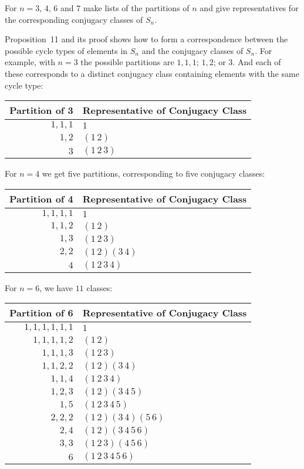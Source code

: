  For $n = 3$, $4$, $6$ and $7$ make lists of the partitions
of $n$ and give representatives for the corresponding conjugacy
classes of $S_n$.
\begin{solution}
  Proposition~11 and its proof shows how to form a correspondence
  between the possible cycle types of elements in $S_n$ and the
  conjugacy classes of $S_n$. For example, with $n = 3$ the possible
  partitions are $1, 1, 1$; $1, 2$; or $3$. And each of these
  corresponds to a distinct conjugacy class containing elements with
  the same cycle type:
  \begin{center}
    \begin{tabular}{r|l}
      \bf Partition of 3 & \bf Representative of Conjugacy Class \\
      \hline
      $1, 1, 1$ & $1$ \\
      $1, 2$ & $(1\,2)$ \\
      $3$ & $(1\,2\,3)$
    \end{tabular}
  \end{center}

  For $n = 4$ we get five partitions, corresponding to five conjugacy
  classes:
  \begin{center}
    \begin{tabular}{r|l}
      \bf Partition of 4 & \bf Representative of Conjugacy Class \\
      \hline
      $1, 1, 1, 1$ & $1$ \\
      $1, 1, 2$ & $(1\,2)$ \\
      $1, 3$ & $(1\,2\,3)$ \\
      $2, 2$ & $(1\,2)(3\,4)$ \\
      $4$ & $(1\,2\,3\,4)$
    \end{tabular}
  \end{center}

  For $n = 6$, we have $11$ classes:
  \begin{center}
    \begin{tabular}{r|l}
      \bf Partition of 6 & \bf Representative of Conjugacy Class \\
      \hline
      $1, 1, 1, 1, 1, 1$ & $1$ \\
      $1, 1, 1, 1, 2$ & $(1\,2)$ \\
      $1, 1, 1, 3$ & $(1\,2\,3)$ \\
      $1, 1, 2, 2$ & $(1\,2)(3\,4)$ \\
      $1, 1, 4$ & $(1\,2\,3\,4)$ \\
      $1, 2, 3$ & $(1\,2)(3\,4\,5)$ \\
      $1, 5$ & $(1\,2\,3\,4\,5)$ \\
      $2, 2, 2$ & $(1\,2)(3\,4)(5\,6)$ \\
      $2, 4$ & $(1\,2)(3\,4\,5\,6)$ \\
      $3, 3$ & $(1\,2\,3)(4\,5\,6)$ \\
      $6$ & $(1\,2\,3\,4\,5\,6)$
    \end{tabular}
  \end{center}


\end{solution}
